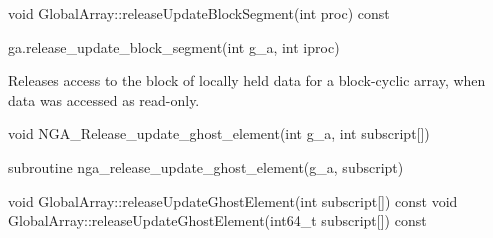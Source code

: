 \documentclass[12pt]{article}
\begin{document}
\begin{cxxapi}
\begin{cxxcode}
void GlobalArray::releaseUpdateBlockSegment(int proc) const
\end{cxxcode}
\begin{funcargs}
\end{funcargs}
\end{cxxapi}

\begin{pyapi}
\begin{pycode}
ga.release_update_block_segment(int g_a, int iproc)
\end{pycode}
\begin{funcargs}
\end{funcargs}
\end{pyapi}

\local

\begin{desc}

Releases access to the block of locally held data for a block-cyclic array,
when data was accessed as read-only.

\end{desc}



\begin{capi}
\begin{ccode}
void NGA_Release_update_ghost_element(int g_a, int subscript[])
\end{ccode}
\begin{funcargs}
\end{funcargs}
\end{capi}

\begin{fapi}
\begin{fcode}
subroutine nga_release_update_ghost_element(g_a, subscript)
\end{fcode}
\begin{funcargs}
\end{funcargs}
\end{fapi}

\begin{cxxapi}
\begin{cxxcode}
void GlobalArray::releaseUpdateGhostElement(int subscript[]) const
void GlobalArray::releaseUpdateGhostElement(int64_t subscript[]) const
\end{cxxcode}
\begin{funcargs}
\end{funcargs}
\end{cxxapi}
\end{document}

